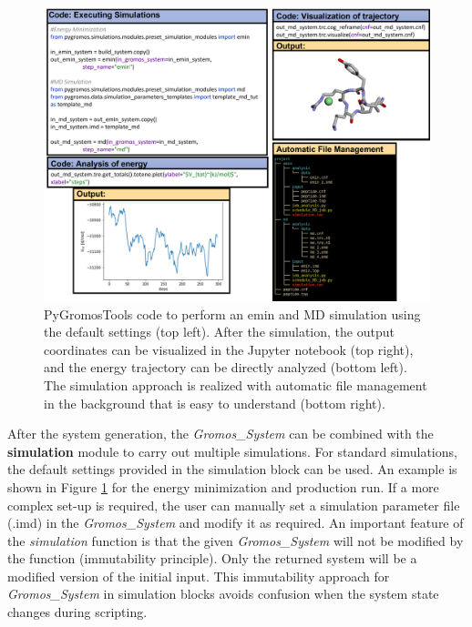 \begin{figure}[h!]
    \centering
    \includegraphics[width=\textwidth]{fig/ApplicationExamples/codeExample_GROMOSSystemSimulation.png}
    \caption{PyGromosTools code to perform an emin and MD simulation using the default settings (top left). After the simulation, the output coordinates can be visualized in the Jupyter notebook (top right), and the energy trajectory can be directly analyzed (bottom left). The simulation approach is realized with automatic file management in the background that is easy to understand (bottom right).}
    \label{fig: GROMOSSystemSimulationExample}
\end{figure}

After the system generation, the \textit{Gromos\_System} can be combined with the \textbf{simulation} module to carry out multiple simulations. For standard simulations, the default settings provided in the simulation block can be used. An example is shown in Figure \ref{fig: GROMOSSystemSimulationExample} for the energy minimization and production run. If a more complex set-up is required, the user can manually set a simulation parameter file (.imd) in the \textit{Gromos\_System} and modify it as required. An important feature of the \textit{simulation} function is that the given \textit{Gromos\_System} will not be modified by the function (immutability principle). Only the returned system will be a modified version of the initial input. This immutability approach for \textit{Gromos\_System} in simulation blocks avoids confusion when the system state changes during scripting. 

